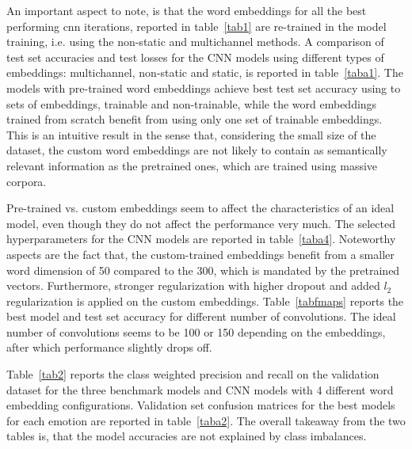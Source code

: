 \documentclass[conference]{IEEEtran}
\begin{document}
An important aspect to note, is that the word embeddings for all the best performing cnn iterations, reported in table~\ref{tab1} are re-trained in the model training, i.e. using the non-static and multichannel methods. A comparison of test set accuracies and test losses for the CNN models using different types of embeddings: multichannel, non-static and static, is reported in table~\ref{taba1}. The models with pre-trained word embeddings achieve best test set accuracy using to sets of embeddings, trainable and non-trainable, while the word embeddings trained from scratch benefit from using only one set of trainable embeddings. This is an intuitive result in the sense that, considering the small size of the dataset, the custom word embeddings are not likely to contain as semantically relevant information as the pretrained ones, which are trained using massive corpora.

Pre-trained vs. custom embeddings seem to affect the characteristics of an ideal model, even though they do not affect the performance very much. The selected hyperparameters for the CNN models are reported in table~\ref{taba4}. Noteworthy aspects are the fact that, the custom-trained embeddings benefit from a smaller word dimension of 50 compared to the 300, which is mandated by the pretrained vectors. Furthermore, stronger regularization with higher dropout and added $l_2$ regularization is applied on the custom embeddings. Table~\ref{tabfmaps} reports the best model and test set accuracy for different number of convolutions. The ideal number of convolutions seems to be 100 or 150 depending on the embeddings, after which performance slightly drops off.

Table~\ref{tab2} reports the class weighted precision and recall on the validation dataset for the three benchmark models and CNN models with 4 different word embedding configurations. Validation set confusion matrices for the best models for each emotion are reported in table~\ref{taba2}. The overall takeaway from the two tables is, that the model accuracies are not explained by class imbalances.
\end{document}
